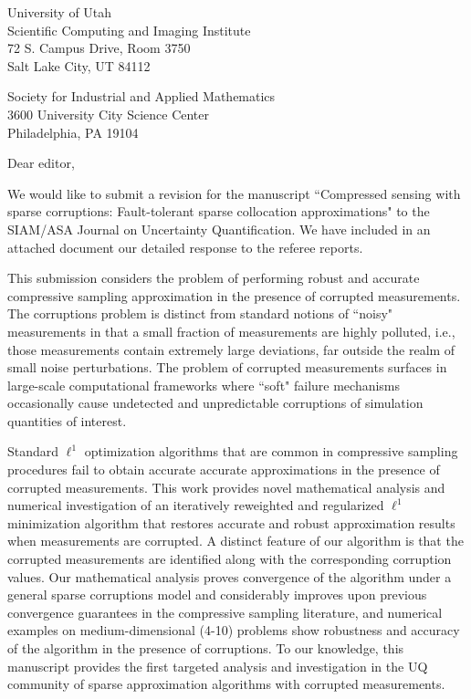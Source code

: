 \documentclass[10pt]{amsart}
\begin{document}
\thispagestyle{empty}
\begin{flushright}
University of Utah\\
Scientific Computing and Imaging Institute \\
72 S. Campus Drive, Room 3750\\
Salt Lake City, UT 84112 \\
\end{flushright}
\vskip 15pt

\noindent 
Society for Industrial and Applied Mathematics \\
3600 University City Science Center \\
Philadelphia, PA 19104 \vskip 15pt

\noindent Dear editor,
\vskip 10pt

We would like to submit a revision for the manuscript ``Compressed sensing with sparse corruptions: Fault-tolerant sparse collocation approximations" to the SIAM/ASA Journal on Uncertainty Quantification. We have included in an attached document our detailed response to the referee reports.

This submission considers the problem of performing robust and accurate compressive sampling approximation in the presence of corrupted measurements. The corruptions problem is distinct from standard notions of ``noisy" measurements in that a small fraction of measurements are highly polluted, i.e., those measurements contain extremely large deviations, far outside the realm of small noise perturbations. The problem of corrupted measurements surfaces in large-scale computational frameworks where ``soft" failure mechanisms occasionally cause undetected and unpredictable corruptions of simulation quantities of interest.

Standard $\ell^1$ optimization algorithms that are common in compressive sampling procedures fail to obtain accurate accurate approximations in the presence of corrupted measurements. This work provides novel mathematical analysis and numerical investigation of an iteratively reweighted and regularized $\ell^1$ minimization algorithm that restores accurate and robust approximation results when measurements are corrupted. A distinct feature of our algorithm is that the corrupted measurements are identified along with the corresponding corruption values. Our mathematical analysis proves convergence of the algorithm under a general sparse corruptions model and considerably improves upon previous convergence guarantees in the compressive sampling literature, and numerical examples on medium-dimensional (4-10) problems show robustness and accuracy of the algorithm in the presence of corruptions. To our knowledge, this manuscript provides the first targeted analysis and investigation in the UQ community of sparse approximation algorithms with corrupted measurements.
\end{document}
